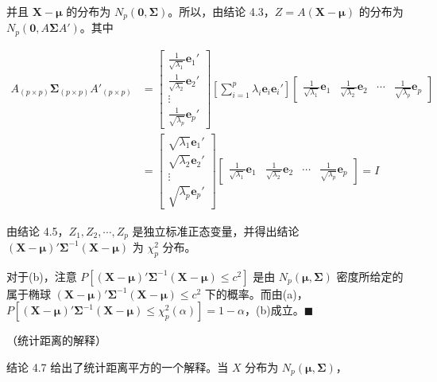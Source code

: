 并且 $\mathbf{X}-\boldsymbol{\mu}$ 的分布为 $N_p(\mathbf{0},\boldsymbol{\Sigma})$。所以，由结论 4.3，$Z=A(\mathbf{X}-\boldsymbol{\mu})$ 的分布为 $N_p(\mathbf{0},A\boldsymbol{\Sigma}A')$。其中

\begin{align*}
A_{(p\times p)}\boldsymbol{\Sigma}_{(p\times p)}A'_{(p\times p)}&=\begin{bmatrix}\frac{1}{\sqrt{\lambda_1}}\mathbf{e}_1'\\\frac{1}{\sqrt{\lambda_2}}\mathbf{e}_2'\\\vdots\\\frac{1}{\sqrt{\lambda_p}}\mathbf{e}_p'\end{bmatrix}\left[\sum_{i=1}^{p}\lambda_i\mathbf{e}_i\mathbf{e}_i'\right]\begin{bmatrix}\frac{1}{\sqrt{\lambda_1}}\mathbf{e}_1 & \frac{1}{\sqrt{\lambda_2}}\mathbf{e}_2 & \cdots & \frac{1}{\sqrt{\lambda_p}}\mathbf{e}_p\end{bmatrix}\\
&=\begin{bmatrix}\sqrt{\lambda_1}\mathbf{e}_1'\\\sqrt{\lambda_2}\mathbf{e}_2'\\\vdots\\\sqrt{\lambda_p}\mathbf{e}_p'\end{bmatrix}\begin{bmatrix}\frac{1}{\sqrt{\lambda_1}}\mathbf{e}_1 & \frac{1}{\sqrt{\lambda_2}}\mathbf{e}_2 & \cdots & \frac{1}{\sqrt{\lambda_p}}\mathbf{e}_p\end{bmatrix}=I
\end{align*}

由结论 4.5，$Z_1,Z_2,\cdots,Z_p$ 是独立标准正态变量，并得出结论 $(\mathbf{X}-\boldsymbol{\mu})'\boldsymbol{\Sigma}^{-1}(\mathbf{X}-\boldsymbol{\mu})$ 为 $\chi_p^2$ 分布。

对于(b)，注意 $P[(\mathbf{X}-\boldsymbol{\mu})'\boldsymbol{\Sigma}^{-1}(\mathbf{X}-\boldsymbol{\mu})\leqslant c^2]$ 是由 $N_p(\boldsymbol{\mu},\boldsymbol{\Sigma})$ 密度所给定的属于椭球 $(\mathbf{X}-\boldsymbol{\mu})'\boldsymbol{\Sigma}^{-1}(\mathbf{X}-\boldsymbol{\mu})\leqslant c^2$ 下的概率。而由(a)，$P[(\mathbf{X}-\boldsymbol{\mu})'\boldsymbol{\Sigma}^{-1}(\mathbf{X}-\boldsymbol{\mu})\leqslant\chi_p^2(\alpha)]=1-\alpha$，(b)成立。\hfill$\blacksquare$

\quad （统计距离的解释）

结论 4.7 给出了统计距离平方的一个解释。当 $X$ 分布为 $N_p(\boldsymbol{\mu},\boldsymbol{\Sigma})$，
